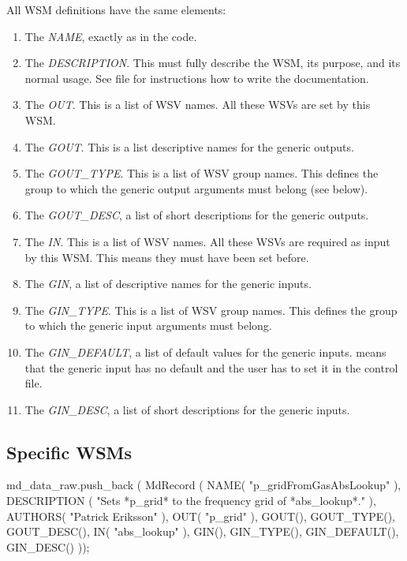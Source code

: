 \noindent
All WSM definitions have the same elements:
\begin{enumerate}
\item The \emph{NAME}, exactly as in the code.
\item The \emph{DESCRIPTION}. This must fully describe the WSM, its
  purpose, and its normal usage. See file  for
  instructions how to write the documentation.
\item The \emph{OUT}. This is a list of WSV names.
All these WSVs are set by this WSM.
\item The \emph{GOUT}. This is a list descriptive names for the generic
outputs.
\item The \emph{GOUT\_TYPE}. This is a list of WSV group names.
This defines the group to which the generic output arguments must belong
(see below).
\item The \emph{GOUT\_DESC}, a list of short descriptions for the generic outputs.
\item The \emph{IN}. This is a list of WSV names.
All these WSVs are required as input by this WSM. This means they must have
been set before.
\item The \emph{GIN}, a list of descriptive names for the generic inputs.
\item The \emph{GIN\_TYPE}. This is a list of WSV group names.
This defines the group to which the generic input arguments must belong.
\item The \emph{GIN\_DEFAULT}, a list of default values for the generic inputs.
 means that the generic input has no default and the user has
to set it in the control file.
\item The \emph{GIN\_DESC}, a list of short descriptions for the generic inputs.
\end{enumerate}

\subsection{Specific WSMs}

\begin{code}
md_data_raw.push_back     
  ( MdRecord
    ( NAME( "p_gridFromGasAbsLookup" ),
      DESCRIPTION
      (
       "Sets *p_grid* to the frequency grid of *abs_lookup*.\n"
      ),
      AUTHORS( "Patrick Eriksson" ),
      OUT( "p_grid" ),
      GOUT(),
      GOUT_TYPE(),
      GOUT_DESC(),
      IN( "abs_lookup" ),
      GIN(),
      GIN_TYPE(),
      GIN_DEFAULT(),
      GIN_DESC()
      ));
\end{code}

